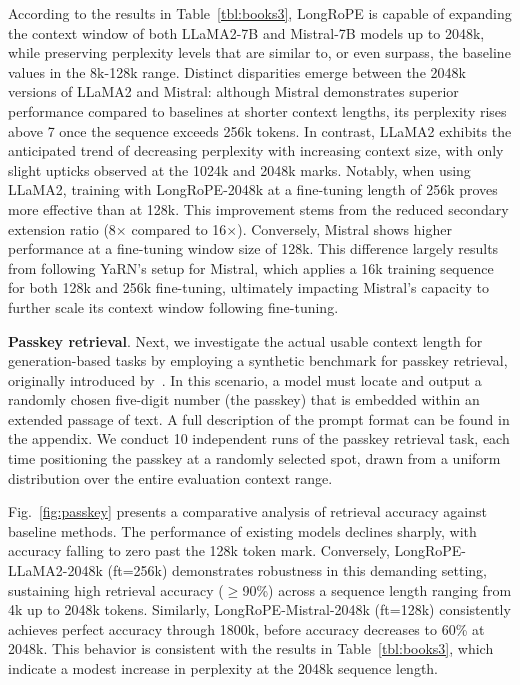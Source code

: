 According to the results in Table~\ref{tbl:books3}, LongRoPE is capable of expanding the context window of both LLaMA2-7B and Mistral-7B models up to 2048k, while preserving perplexity levels that are similar to, or even surpass, the baseline values in the 8k-128k range. Distinct disparities emerge between the 2048k versions of LLaMA2 and Mistral: although Mistral demonstrates superior performance compared to baselines at shorter context lengths, its perplexity rises above 7 once the sequence exceeds 256k tokens. In contrast, LLaMA2 exhibits the anticipated trend of decreasing perplexity with increasing context size, with only slight upticks observed at the 1024k and 2048k marks. Notably, when using LLaMA2, training with LongRoPE-2048k at a fine-tuning length of 256k proves more effective than at 128k. This improvement stems from the reduced secondary extension ratio (8$\times$ compared to 16$\times$). Conversely, Mistral shows higher performance at a fine-tuning window size of 128k. This difference largely results from following YaRN's setup for Mistral, which applies a 16k training sequence for both 128k and 256k fine-tuning, ultimately impacting Mistral’s capacity to further scale its context window following fine-tuning.

\textbf{Passkey retrieval}. Next, we investigate the actual usable context length for generation-based tasks by employing a synthetic benchmark for passkey retrieval, originally introduced by~\cite{passkey}. In this scenario, a model must locate and output a randomly chosen five-digit number (the passkey) that is embedded within an extended passage of text. A full description of the prompt format can be found in the appendix. We conduct 10 independent runs of the passkey retrieval task, each time positioning the passkey at a randomly selected spot, drawn from a uniform distribution over the entire evaluation context range.

Fig.~\ref{fig:passkey} presents a comparative analysis of retrieval accuracy against baseline methods. The performance of existing models declines sharply, with accuracy falling to zero past the 128k token mark. Conversely, LongRoPE-LLaMA2-2048k (ft=256k) demonstrates robustness in this demanding setting, sustaining high retrieval accuracy ($\ge$90\%) across a sequence length ranging from 4k up to 2048k tokens. Similarly, LongRoPE-Mistral-2048k (ft=128k) consistently achieves perfect accuracy through 1800k, before accuracy decreases to 60\% at 2048k. This behavior is consistent with the results in Table~\ref{tbl:books3}, which indicate a modest increase in perplexity at the 2048k sequence length.

